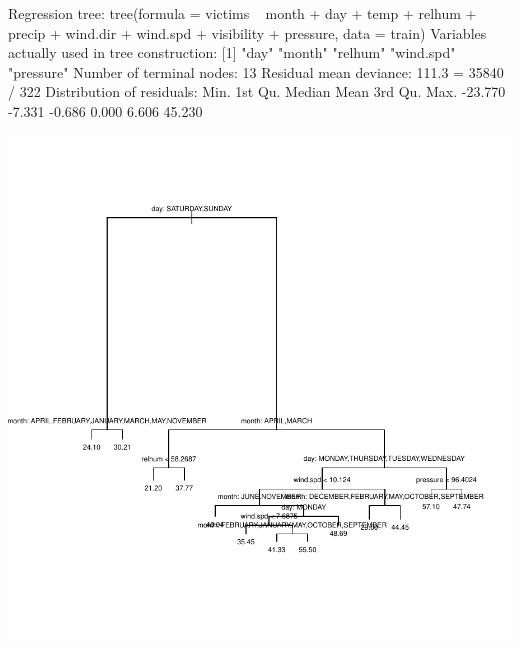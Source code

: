 \documentclass[11pt, a4paper]{article}
\begin{document}
\begin{Schunk}
\begin{Soutput}
Regression tree:
tree(formula = victims ~ month + day + temp + relhum + precip + 
    wind.dir + wind.spd + visibility + pressure, data = train)
Variables actually used in tree construction:
[1] "day"      "month"    "relhum"   "wind.spd" "pressure"
Number of terminal nodes:  13 
Residual mean deviance:  111.3 = 35840 / 322 
Distribution of residuals:
   Min. 1st Qu.  Median    Mean 3rd Qu.    Max. 
-23.770  -7.331  -0.686   0.000   6.606  45.230 
\end{Soutput}
\end{Schunk}
\includegraphics{regression-036}
\end{document}
